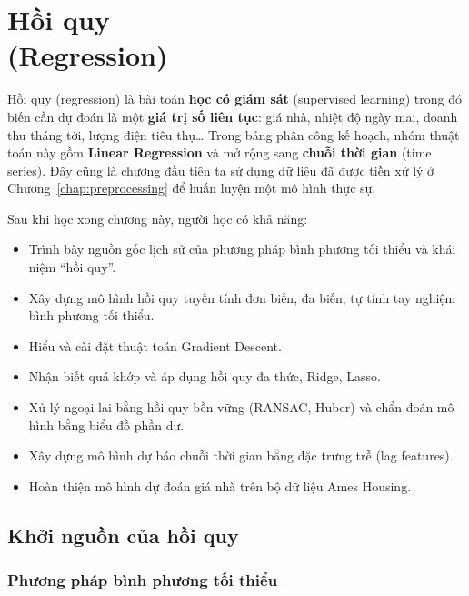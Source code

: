 
\chapter{Hồi quy \\ (Regression)}
\label{chap:regression}

Hồi quy (regression) là bài toán \textbf{học có giám sát} (supervised learning) trong đó biến cần dự đoán là một \textbf{giá trị số liên tục}: giá nhà, nhiệt độ ngày mai, doanh thu tháng tới, lượng điện tiêu thụ\ldots{} Trong bảng phân công kế hoạch, nhóm thuật toán này gồm \textbf{Linear Regression} và mở rộng sang \textbf{chuỗi thời gian} (time series). Đây cũng là chương đầu tiên ta sử dụng dữ liệu đã được tiền xử lý ở Chương~\ref{chap:preprocessing} để huấn luyện một mô hình thực sự.

\noindent Sau khi học xong chương này, người học có khả năng:
\begin{itemize}
    \item Trình bày nguồn gốc lịch sử của phương pháp bình phương tối thiểu và khái niệm ``hồi quy''.
    \item Xây dựng mô hình hồi quy tuyến tính đơn biến, đa biến; tự tính tay nghiệm bình phương tối thiểu.
    \item Hiểu và cài đặt thuật toán Gradient Descent.
    \item Nhận biết quá khớp và áp dụng hồi quy đa thức, Ridge, Lasso.
    \item Xử lý ngoại lai bằng hồi quy bền vững (RANSAC, Huber) và chẩn đoán mô hình bằng biểu đồ phần dư.
    \item Xây dựng mô hình dự báo chuỗi thời gian bằng đặc trưng trễ (lag features).
    \item Hoàn thiện mô hình dự đoán giá nhà trên bộ dữ liệu Ames Housing.
\end{itemize}

\section{Khởi nguồn của hồi quy}

\subsection{Phương pháp bình phương tối thiểu}

